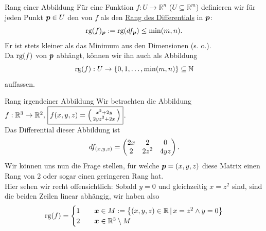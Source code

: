 \begin{Def}
{Rang einer Abbildung}
Für eine Funktion $f:U\to\mathbb{R}^n$ ($U\subseteq\mathbb{R}^m$) definieren wir für jeden Punkt ${{\text{\boldmath${p}$}}}\in U$ den  von $f$ als den \underline{Rang des Differentials} in ${{\text{\boldmath${p}$}}}$:
\begin{equation}
    \text{rg}(f)_{{\text{\boldmath${p}$}}}:=\text{rg}(df_{{\text{\boldmath${p}$}}})\leq\min(m,n).
\end{equation}
Er ist stets kleiner als das Minimum aus den Dimensionen (s. o.).\\
Da $\text{rg}(f)$ von ${{\text{\boldmath${p}$}}}$ abhängt, können wir ihn auch als Abbildung
\begin{equation}
    \text{rg}(f):U\to\left\{0,1,\ldots,\min(m,n)\right\}\subseteq\mathbb{N}
\end{equation}
auffassen.
\end{Def}
\begin{Beispiel}
{Rang irgendeiner Abbildung}
Wir betrachten die Abbildung $f:\mathbb{R}^3\to\mathbb{R}^2,\,\boxed{f(x,y,z)=\left(\begin{smallmatrix}x^2+2y\\2yz^2+2x\end{smallmatrix}\right)}$.\\
Das Differential dieser Abbildung ist
\begin{equation*}
    df_{(x,y,z)}=\begin{pmatrix}2x&2&0\\2&2z^2&4yz\end{pmatrix}.
\end{equation*}
Wir können uns nun die Frage stellen, für welche ${{\text{\boldmath${p}$}}}=(x,y,z)$ diese Matrix einen Rang von 2 oder sogar einen geringeren Rang hat.\\
Hier sehen wir recht offensichtlich: Sobald $y=0$ und gleichzeitig $x=z^2$ sind, sind die beiden Zeilen linear abhängig, wir haben also
\begin{equation*}
    \text{rg}(f)=\begin{cases}1\quad & {{\text{\boldmath${x}$}}}\in M:=\left\{(x,y,z)\in\mathbb{R}\,|\, x=z^2\land y=0\right\}\\ 2&{{\text{\boldmath${x}$}}}\in\mathbb{R}^3\setminus M\end{cases}
\end{equation*}
\end{Beispiel}
